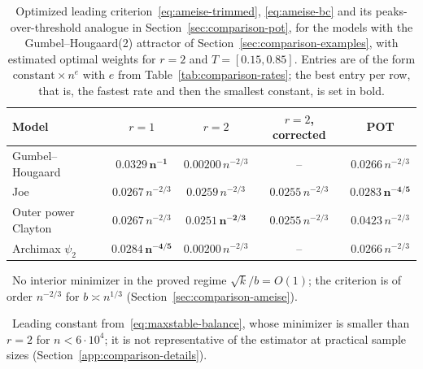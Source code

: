 \begin{table}[t]
\centering
\small
\caption{Optimized leading criterion~\eqref{eq:ameise-trimmed},
\eqref{eq:ameise-bc} and its peaks-over-threshold analogue in
Section~\ref{sec:comparison-pot}, for the models with the
Gumbel--Hougaard(2) attractor of Section~\ref{sec:comparison-examples}, with
estimated optimal weights for $r=2$ and $T=[0.15,0.85]$. Entries are of the form
$\text{constant}\times n^{e}$ with $e$ from Table~\ref{tab:comparison-rates};
the best entry per row, that is, the fastest rate and then the smallest
constant, is set in bold.}
\label{tab:comparison-ameise}
\begin{tabular}{lcccc}
\toprule
Model & $r=1$ & $r=2$ & $r=2$, corrected & POT\\
\midrule
Gumbel--Hougaard
 & $\bm{0.0329\,n^{-1}}$
 & $0.00200\,n^{-2/3}$\rlap{\,\textsuperscript{\ddag}}
 & --\rlap{\,\textsuperscript{\dag}}
 & $0.0266\,n^{-2/3}$\\
Joe
 & $0.0267\,n^{-2/3}$
 & $0.0259\,n^{-2/3}$
 & $0.0255\,n^{-2/3}$
 & $\bm{0.0283\,n^{-4/5}}$\\
Outer power Clayton
 & $0.0267\,n^{-2/3}$
 & $\bm{0.0251\,n^{-2/3}}$
 & $0.0255\,n^{-2/3}$
 & $0.0423\,n^{-2/3}$\\
Archimax $\psi_2$
 & $\bm{0.0284\,n^{-4/5}}$
 & $0.00200\,n^{-2/3}$\rlap{\,\textsuperscript{\ddag}}
 & --\rlap{\,\textsuperscript{\dag}}
 & $0.0266\,n^{-2/3}$\\
\bottomrule
\end{tabular}

\smallskip
{\footnotesize
\dag~No interior minimizer in the proved regime
$\sqrt{k}/b=O(1)$; the criterion is of order $n^{-2/3}$ for
$b\asymp n^{1/3}$ (Section~\ref{sec:comparison-ameise}).\par
\ddag~Leading constant from~\eqref{eq:maxstable-balance}, whose
minimizer is smaller than $r=2$ for $n<6\cdot10^{4}$; it is not representative of
the estimator at practical sample sizes (Section~\ref{app:comparison-details}).}
\end{table}
